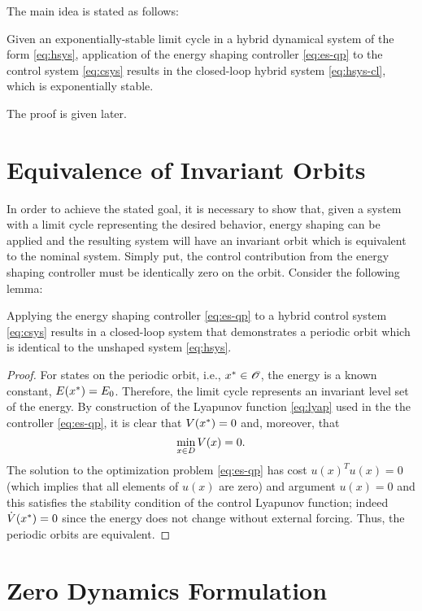 \documentclass[twocolumn]{article}
\begin{document}
The main idea is stated as follows:
\begin{theorem}
  Given an exponentially-stable limit cycle in a hybrid dynamical system of the form \eqref{eq:hsys}, application of the energy shaping controller \eqref{eq:es-qp} to the control system \eqref{eq:csys} results in the closed-loop hybrid system \eqref{eq:hsys-cl}, which is exponentially stable.
\end{theorem}

The proof is given later.



\section{Equivalence of Invariant Orbits}
In order to achieve the stated goal, it is necessary to show that, given a system with a limit cycle representing the desired behavior, energy shaping can be applied and the resulting system will have an invariant orbit which is equivalent to the nominal system. Simply put, the control contribution from the energy shaping controller must be identically zero on the orbit. Consider the following lemma:

\begin{lemma}
  Applying the energy shaping controller \eqref{eq:es-qp} to a hybrid control system \eqref{eq:csys} results in a closed-loop system that demonstrates a periodic orbit which is identical to the unshaped system \eqref{eq:hsys}.
\end{lemma}

\begin{proof}
  For states on the periodic orbit, i.e., $x^{*} \in \mathscr{O}$, the energy is a known constant, $E(x^{*}) = E_{0}$.
  Therefore, the limit cycle represents an invariant level set of the energy.
  By construction of the Lyapunov function \eqref{eq:lyap} used in the the controller \eqref{eq:es-qp}, it is clear that $V(x^{*}) = 0$ and, moreover, that $$\min_{x \in D} V(x) = 0.$$
  The solution to the optimization problem \eqref{eq:es-qp} has cost $u(x)^T u(x) = 0$ (which implies that all elements of $u(x)$ are zero) and argument $u(x) = 0$ and this satisfies the stability condition of the control Lyapunov function; indeed ${\dot V}(x^{*}) = 0$ since the energy does not change without external forcing.
  Thus, the periodic orbits are equivalent.
\end{proof}

\section{Zero Dynamics Formulation}
\end{document}
